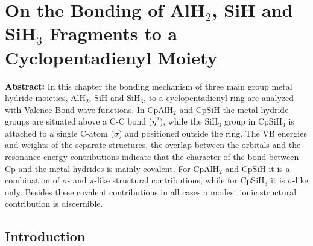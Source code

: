 \chapter{On the Bonding of AlH$_2$, SiH and SiH$_3$ Fragments to a Cyclopentadienyl Moiety}
\label{chap_cyclopentadienyl}


\noindent\textbf{Abstract:} In this chapter the bonding mechanism of three main group metal hydride moieties, AlH$_2$, SiH and SiH$_3$, to a cyclopentadienyl ring are analyzed with Valence Bond wave functions. In CpAlH$_2$ and CpSiH the metal hydride groups are situated above a C-C bond ($\eta^2$), while the SiH$_3$ group in CpSiH$_3$ is attached to a single C-atom ($\sigma$) and positioned outside the ring. The VB energies and weights of the separate structures, the overlap between the orbitals and the resonance energy contributions indicate that the character of the bond between Cp and the metal hydrides is mainly covalent. For CpAlH$_2$ and CpSiH it is a combination of $\sigma$- and $\pi$-like structural contributions, while for CpSiH$_3$ it is $\sigma$-like only. Besides these covalent contributions in all cases a modest ionic structural contribution is discernible.

\clearpage

\section{Introduction}





